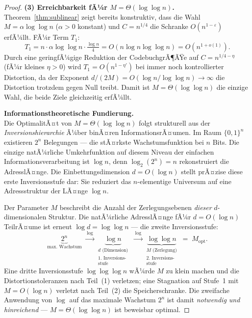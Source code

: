 ﻿\documentclass[12pt,a4paper]{article}
\begin{document}
\begin{proof}
\medskip
\textbf{(3) Erreichbarkeit fÃ¼r $M = \Theta(\log\log n)$.}\\
Theorem~\ref{thm:sublinear} zeigt bereits konstruktiv, dass die 
Wahl $M = \alpha \log\log n$ ($\alpha > 0$ konstant) und 
$C = n^{1/4}$ die Schranke $O(n^{1-\varepsilon})$ erfÃ¼llt.
FÃ¼r Term $T_1$:
\[
  T_1 = n \cdot \alpha\log\log n \cdot \tfrac{\log n}{4}
      = O\!\left(n \log n \log\log n\right)
      = O\!\left(n^{1+o(1)}\right).
\]
Durch eine geringfÃ¼gige Reduktion der CodebuchgrÃ¶ÃŸe auf 
$C = n^{1/4-\eta}$ (fÃ¼r kleines $\eta > 0$) wird $T_1 = O(n^{1-\eta'})$ 
bei immer noch kontrollierter Distortion, da der Exponent 
$d/(2M) = O(\log n / \log\log n) \to \infty$ die Distortion trotzdem 
gegen Null treibt. Damit ist $M = \Theta(\log\log n)$ die einzige 
Wahl, die beide Ziele gleichzeitig erfÃ¼llt.

\medskip
\textbf{Informationstheoretische Fundierung.}\\
Die OptimalitÃ¤t von $M = \Theta(\log\log n)$ folgt strukturell aus 
der \emph{Inversionshierarchie} Ã¼ber binÃ¤ren InformationsrÃ¤umen.
Im Raum $\{0,1\}^n$ existieren $2^n$ Belegungen --- die stÃ¤rkste 
Wachstumsfunktion bei $n$ Bits. Die einzige natÃ¼rliche Umkehrfunktion 
auf diesem Niveau der einfachen Informationsverarbeitung ist 
$\log n$, denn $\log_2(2^n) = n$ rekonstruiert die AdresslÃ¤nge. 
Die Einbettungsdimension $d = O(\log n)$ stellt prÃ¤zise diese erste 
Inversionsstufe dar: Sie reduziert das $n$-elementige Universum 
auf eine Adressstruktur der LÃ¤nge $\log n$.

Der Parameter $M$ beschreibt die Anzahl der Zerlegungsebenen 
\emph{dieser} $d$-dimensionalen Struktur. Die natÃ¼rliche AdresslÃ¤nge 
fÃ¼r $d = O(\log n)$ TeilrÃ¤ume ist erneut $\log d = \log\log n$ --- 
die zweite Inversionsstufe:
\[
  \underbrace{2^n}_{\text{max.\ Wachstum}}
  \;\xrightarrow{\;\log\;}
  \underbrace{\log n}_{\substack{d\text{ (Dimension)}\\\text{1.~Inversions-}\\\text{stufe}}}
  \;\xrightarrow{\;\log\;}
  \underbrace{\log\log n}_{\substack{M\text{ (Zerlegung)}\\\text{2.~Inversions-}\\\text{stufe}}}
  \;=\; M_{\mathrm{opt}}.
\]
Eine dritte Inversionsstufe $\log\log\log n$ wÃ¼rde $M$ zu klein machen 
und die Distortionstoleranzen nach Teil~(1) verletzen; eine Stagnation 
auf Stufe~1 mit $M = O(\log n)$ verletzt nach Teil~(2) die 
Speicherschranke. Die zweifache Anwendung von $\log$ auf das maximale 
Wachstum $2^n$ ist damit \emph{notwendig und hinreichend} --- 
$M = \Theta(\log\log n)$ ist beweisbar optimal.
\end{proof}
\end{document}
